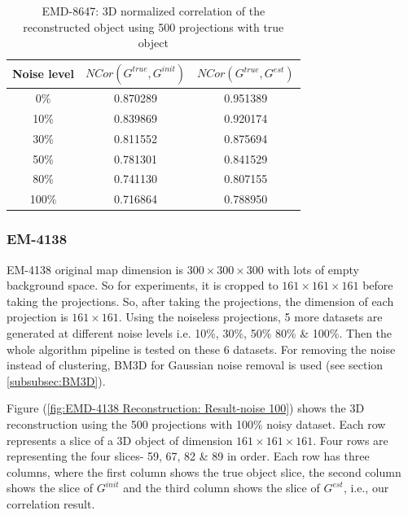\documentclass[twoside]{iitbreport}
\begin{document}
\begin{table}[H]
    \centering
     \begin{tabular}{||c c c||} 
             \hline
             Noise level & $ NCor(G^{true},G^{init})$  &  $NCor(G^{true},G^{est})$ \\
             \hline\hline
            0\%  & 0.870289 & 0.951389 \\
            \hline
            10\% & 0.839869 & 0.920174	 \\
            \hline
            30\% & 0.811552 & 0.875694    \\
            \hline
            50\% & 0.781301 & 0.841529 \\
            \hline
            80\% & 0.741130 & 0.807155 \\
            \hline
            100\%& 0.716864 & 0.788950 \\[1ex] 
            \hline
    \end{tabular}
    \captionsetup{justification=centering}
    \caption{EMD-8647: 3D normalized correlation of the reconstructed object using 500 projections with true object }
    \label{tbl:our_arp_8647_result-3d-correlation}
\end{table}

\subsubsection{\textbf{EM-4138}}

EM-4138 original map dimension is $300\times300\times300$  with lots of empty background space. So for experiments, it is cropped to $161\times161\times161$ before taking the projections. So, after taking the projections, the dimension of each projection is $161\times161$. Using the noiseless projections, 5 more datasets are generated at different noise levels i.e. 10\%, 30\%, 50\% 80\% \& 100\%. Then the whole algorithm pipeline is tested on these 6 datasets. For removing the noise instead of clustering, BM3D for Gaussian noise removal is used (see section \ref{subsubsec:BM3D}). 

Figure (\ref{fig:EMD-4138 Reconstruction: Result-noise 100}) shows the 3D reconstruction using the 500 projections with 100\% noisy dataset. Each row represents a slice of a 3D object of dimension $161\times161\times161$. Four rows are representing the four slices- 59, 67, 82 \& 89 in order. Each row has three columns, where the first column shows the true object slice, the second column shows the slice of $G^{init}$ and the third column shows the slice of $G^{est}$, i.e., our correlation result.
\end{document}
